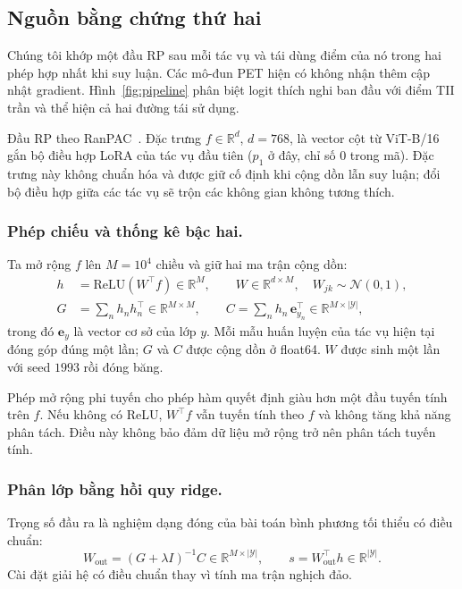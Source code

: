 \documentclass[runningheads]{llncs}
\begin{document}
\subsection{Nguồn bằng chứng thứ hai}
\label{sec:rp}

Chúng tôi khớp một đầu RP sau mỗi tác vụ và tái dùng điểm của nó trong hai phép
hợp nhất khi suy luận. Các mô-đun PET hiện có không nhận thêm cập nhật gradient.
Hình~\ref{fig:pipeline} phân biệt logit thích nghi ban đầu với điểm TII trần và
thể hiện cả hai đường tái sử dụng.

Đầu RP theo RanPAC~\cite{ref_ranpac}. Đặc trưng $f\in\mathbb R^d$, $d=768$,
là vector cột từ ViT-B/16 gắn bộ điều hợp LoRA của tác vụ đầu tiên ($p_1$ ở
đây, chỉ số $0$ trong mã). Đặc trưng này không chuẩn hóa và được giữ cố định
khi cộng dồn lẫn suy luận; đổi bộ điều hợp giữa các tác vụ sẽ trộn các không
gian không tương thích.

\subsubsection{Phép chiếu và thống kê bậc hai.}
Ta mở rộng $f$ lên $M=10^4$ chiều và giữ hai ma trận cộng dồn:
\begin{align}
h &= \mathrm{ReLU}(W^\top f) \in \mathbb{R}^{M},
\qquad W \in \mathbb{R}^{d \times M},\quad W_{jk}\sim\mathcal N(0,1),
\label{eq:proj}\\
G &= \sum_n h_n h_n^{\top} \in \mathbb{R}^{M \times M},
\qquad
C = \sum_n h_n\, \mathbf{e}_{y_n}^{\top}
   \in \mathbb{R}^{M \times |\mathcal{Y}|},
\label{eq:gram}
\end{align}
trong đó $\mathbf{e}_{y}$ là vector cơ sở của lớp $y$. Mỗi mẫu huấn luyện của
tác vụ hiện tại đóng góp đúng một lần; $G$ và $C$ được cộng dồn ở float64.
$W$ được sinh một lần với seed $1993$ rồi đóng băng.

Phép mở rộng phi tuyến cho phép hàm quyết định giàu hơn một đầu tuyến tính trên
$f$. Nếu không có ReLU, $W^\top f$ vẫn tuyến tính theo $f$ và không tăng khả
năng phân tách. Điều này không bảo đảm dữ liệu mở rộng trở nên phân tách tuyến
tính.

\subsubsection{Phân lớp bằng hồi quy ridge.}
Trọng số đầu ra là nghiệm dạng đóng của bài toán bình phương tối thiểu có điều
chuẩn:
\begin{equation}
W_{\mathrm{out}} = (G + \lambda I)^{-1} C \in \mathbb{R}^{M \times |\mathcal{Y}|},
\qquad
s = W_{\mathrm{out}}^{\top} h \in \mathbb{R}^{|\mathcal{Y}|} .
\label{eq:ridge}
\end{equation}
Cài đặt giải hệ có điều chuẩn thay vì tính ma trận nghịch đảo.
\end{document}
